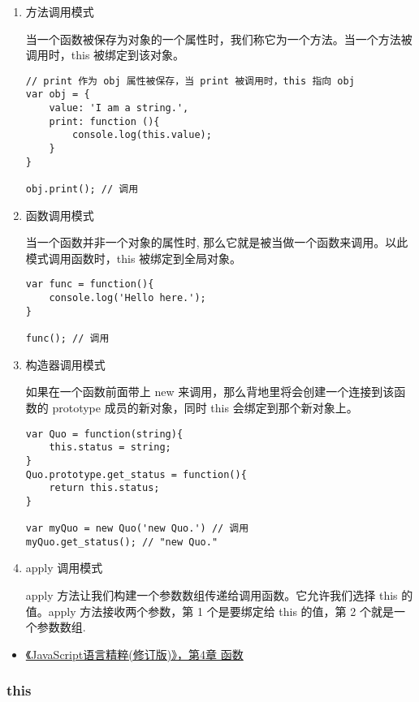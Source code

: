 \begin{enumerate}
\def\labelenumi{\arabic{enumi}.}
\item
  方法调用模式

  当一个函数被保存为对象的一个属性时，我们称它为一个方法。当一个方法被调用时，this
  被绑定到该对象。

\begin{lstlisting}
// print 作为 obj 属性被保存，当 print 被调用时，this 指向 obj
var obj = {
    value: 'I am a string.',
    print: function (){
        console.log(this.value);
    }
}

obj.print(); // 调用
\end{lstlisting}
\item
  函数调用模式

  当一个函数并非一个对象的属性时,
  那么它就是被当做一个函数来调用。以此模式调用函数时，this
  被绑定到全局对象。

\begin{lstlisting}
var func = function(){
    console.log('Hello here.');
}

func(); // 调用
\end{lstlisting}
\item
  构造器调用模式

  如果在一个函数前面带上 new
  来调用，那么背地里将会创建一个连接到该函数的 prototype
  成员的新对象，同时 this 会绑定到那个新对象上。

\begin{lstlisting}
var Quo = function(string){
    this.status = string;
}
Quo.prototype.get_status = function(){
    return this.status;
}

var myQuo = new Quo('new Quo.') // 调用
myQuo.get_status(); // "new Quo."
\end{lstlisting}
\item
  apply 调用模式

  apply 方法让我们构建一个参数数组传递给调用函数。它允许我们选择 this
  的值。apply 方法接收两个参数，第 1 个是要绑定给 this 的值，第 2
  个就是一个参数数组.
\end{enumerate}

\begin{itemize}
\tightlist
\item
  \href{http://book.douban.com/subject/3590768/}{《JavaScript语言精粹(修订版)》，第4章
  函数}
\end{itemize}

\subsubsection{this}\label{this}

